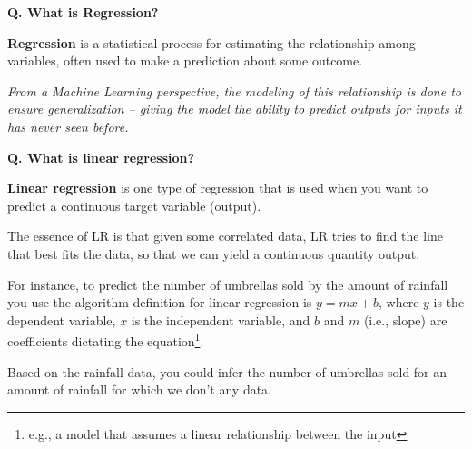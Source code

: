 \begin{frame}[fragile]{\textbf{Q. What is Regression?}}
  \begin{wideitemize}
  \item \textbf{Regression} is a statistical process for estimating
  the relationship among variables, often used to make a prediction about
  some outcome.\medskip
  \begin{wideitemize}
    \item \textit{From a Machine Learning perspective, the modeling of this relationship
    is done to ensure generalization -- giving the model the ability to predict
    outputs for inputs it has never seen before.}
  \end{wideitemize}
  \end{wideitemize}
\end{frame}


\begin{frame}[fragile]{\textbf{Q. What is linear regression?}}
  \begin{wideitemize}
  \item \textbf{Linear regression} is one type of regression that is used when
  you want to predict a continuous target variable (output).\medskip
  \begin{wideitemize}
    \item The essence of LR is that given some correlated data, LR tries to find
    the line that best fits the data, so that we can yield a continuous quantity output.
  \end{wideitemize}
  \item For instance, to predict the number of umbrellas sold by the amount of
  rainfall you use the algorithm definition for linear regression is $y = mx + b$,
  where $y$ is the dependent variable, $x$ is the independent variable, and $b$
  and $m$ (i.e., slope) are coefficients dictating the equation\footnote{e.g., a
  model that assumes a linear relationship between the input}.\medskip
  \begin{wideitemize}
    \item Based on the rainfall data, you could infer the number of umbrellas sold
    for an amount of rainfall for which we don't any data.
  \end{wideitemize}
  \end{wideitemize}
\end{frame}

